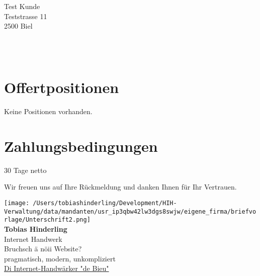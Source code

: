 \documentclass[11pt]{article}
\begin{document}
\vspace*{8mm}
\noindent\begin{flushright}
\begin{minipage}{8cm}
\small Test Kunde\\Teststrasse 11\\2500 Biel
\end{minipage}
\end{flushright}
\par\vspace{10mm}

\\[0.25em]
\\[0.5em]

\vspace{1.0em}



\section*{Offertpositionen}

Keine Positionen vorhanden.

\section*{Zahlungsbedingungen}
30 Tage netto



\vspace{2em}

Wir freuen uns auf Ihre Rückmeldung und danken Ihnen für Ihr Vertrauen.

\vspace{2cm}

\noindent
\begin{minipage}{10cm}
\texttt{[image: /Users/tobiashinderling/Development/HIH-Verwaltung/data/mandanten/usr\_ip3qbw42lw3dgs8swjw/eigene\_firma/briefvorlage/Unterschrift2.png]}\\[0.5em]
\textbf{Tobias Hinderling}\\
Internet Handwerk\\[0.5em]
Bruchsch ä nöii Website?\\[0.3em]
pragmatisch, modern, unkompliziert\\[0.5em]
\href{undefined}{\textcolor{brand}{Di Internet-Handwärker "de Bieu"}}
\end{minipage}
\end{document}
